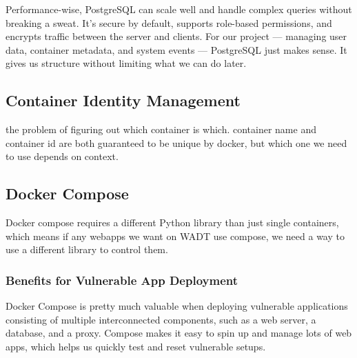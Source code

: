 \documentclass[12pt]{article}
\begin{document}
Performance-wise, PostgreSQL can scale well and handle complex queries without breaking a sweat. It’s secure by default, supports role-based permissions, and encrypts traffic between the server and clients. For our project — managing user data, container metadata, and system events — PostgreSQL just makes sense. It gives us structure without limiting what we can do later.


\subsection{Container Identity Management} \label{subsec:container-identity-management}
the problem of figuring out which container is which. container name and container id are both guaranteed to be unique by docker, but which one we need to use depends on context.

\subsection{Docker Compose}
Docker compose requires a different Python library than just
single containers, which means if any webapps we want on WADT
use compose, we need a way to use a different library to control them.

\subsubsection{Benefits for Vulnerable App Deployment}

Docker Compose is pretty much valuable when deploying vulnerable applications consisting of multiple interconnected components, such as a web server, a database, and a proxy. Compose makes it easy to spin up and manage lots of web apps, which helps us quickly test and reset vulnerable setups.
\end{document}
